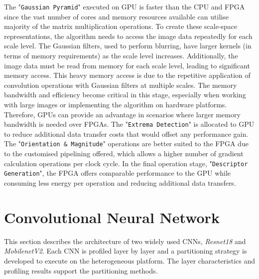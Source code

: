 The "\texttt{Gaussian Pyramid}" executed on GPU is faster than the CPU and FPGA since the vast number of cores and memory resources available can utilise majority of the matrix multiplication operations. To create these scale-space representations, the algorithm needs to access the image data repeatedly for each scale level. The Gaussian filters, used to perform blurring, have larger kernels (in terms of memory requirements) as the scale level increases. Additionally, the image data must be read from memory for each scale level, leading to significant memory access. This heavy memory access is due to the repetitive application of convolution operations with Gaussian filters at multiple scales. The memory bandwidth and efficiency become critical in this stage, especially when working with large images or implementing the algorithm on hardware platforms. Therefore, GPUs can provide an advantage in scenarios where larger memory bandwidth is needed over FPGAs. 
The "\texttt{Extrema Detection}" is allocated to GPU to reduce additional data transfer costs that would offset any performance gain. The "\texttt{Orientation \& Magnitude}" operations are better suited to the FPGA due to the customised pipelining offered, which allows a higher number of gradient calculation operations per clock cycle. In the final operation stage, "\texttt{Descriptor Generation}", the FPGA offers comparable performance to the GPU while consuming less energy per operation and reducing additional data transfers.


\section{Convolutional Neural Network}
This section describes the architecture of two widely used CNNs, \textit{Resnet18} and \textit{MobilenetV2}. Each CNN is profiled layer by layer and a partitioning strategy is developed to execute on the heterogeneous platform. The layer characteristics and profiling results support the partitioning methods.





